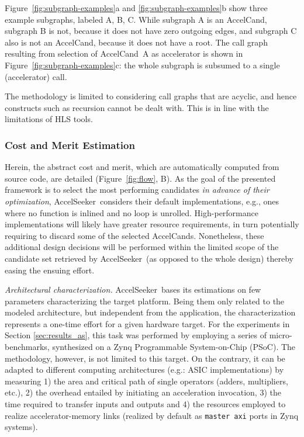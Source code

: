\documentclass[]{usiinfthesis}
\newcommand{\aseeker}{{AccelSeeker}}
\newcommand{\candidate}{{AccelCand}}
\newcommand{\candidates}{{AccelCand}s}
\begin{document}
Figure~\ref{fig:subgraph-examples}a and \ref{fig:subgraph-examples}b
show three example subgraphs, labeled A, B, C. While subgraph A is an
\candidate, subgraph B is not, because it does not have zero outgoing
edges, and subgraph C also is not an \candidate, because it does not
have a root. The call graph resulting from selection of \candidate\ A
as accelerator is shown in Figure~\ref{fig:subgraph-examples}c: the
whole subgraph is subsumed to a single (accelerator) call.\par

The methodology is limited to considering call graphs that are
acyclic, and hence constructs such as recursion cannot be dealt with. This 
is in line with the limitations of HLS tools.

\subsubsection{Cost and Merit Estimation}

Herein, the abstract cost and merit, which are automatically computed from 
source code, are detailed (Figure~\ref{fig:flow}, B). As the goal of the 
presented framework is to select the most performing candidates \emph{in 
advance of their optimization}, \aseeker\ considers their default implementations,
e.g., ones where no function is inlined and no loop is unrolled.
High-performance implementations will likely have greater resource
requirements, in turn potentially requiring to discard some of the
selected \candidates. Nonetheless, these additional design decisions will
be performed within the limited scope of the candidate set retrieved
by \aseeker\ (as opposed to the whole design) thereby easing the
ensuing effort.\par

\emph{Architectural characterization.}
\aseeker\ bases its estimations on few parameters characterizing the
target platform.  Being them only related to the modeled architecture, but 
independent from the application, the characterization represents a one-time 
effort for a given hardware target.
For the experiments in Section \ref{sec:results_as}, this task was
performed by employing a series of micro-benchmarks, synthesized on a
Zynq Programmable System-on-Chip (PSoC). 
The methodology, however, is not limited to this target. On the contrary, it can 
be adapted to different computing architectures (e.g.: ASIC implementations) by 
measuring 1) the area and critical path of single operators (adders, multipliers, 
etc.), 2) the overhead entailed by initiating an acceleration invocation, 3) the 
time required to transfer inputs and outputs and 4) the resources employed to realize 
accelerator-memory links (realized by default as \texttt{master axi} ports in Zynq 
systems).\par
\end{document}
